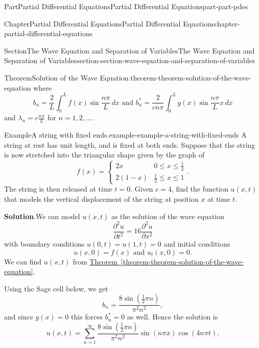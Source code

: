 \documentclass[twoside,10pt,]{book}
\newcommand{\blocktitlefont}{\relax}
\newcommand{\xreffont}{\relax}
\numberwithin{equation}{part}
\newcommand{\pdv}[3][]{\dfrac{\partial^{#1} #2}{\partial #3^{#1}}}
\newcommand{\amp}{&}
\begin{document}
\begin{partptx}{Part}{Partial Differential Equations}{}{Partial Differential Equations}{}{}{part-part-pdes}
\begin{chapterptx}{Chapter}{Partial Differential Equations}{}{Partial Differential Equations}{}{}{chapter-partial-differential-equations}
\begin{sectionptx}{Section}{The Wave Equation and Separation of Variables}{}{The Wave Equation and Separation of Variables}{}{}{section-section-wave-equation-and-separation-of-variables}
\begin{theorem}{Theorem}{Solution of the Wave Equation.}{}{theorem-theorem-solution-of-the-wave-equation}
where%
\begin{equation*}
b_{n} = \frac{2}{L}\int_{0}^{L}f(x)\sin\frac{n\pi}{L}\,dx\text{ and }b^{*}_{n} = \frac{2}{cn\pi}\int_{0}^{L}g(x)\sin\frac{n\pi}{L}x\,dx
\end{equation*}
and \(\lambda_{n} = c\frac{n\pi}{L}\) for \(n=1,2,\ldots\).%
\end{theorem}
\begin{example}{Example}{A string with fixed ends.}{example-example-a-string-with-fixed-ends}%
A string at rest has unit length, and is fixed at both ends. Suppose that the string is now stretched into the triangular shape given by the graph of%
\begin{equation*}
f(x) = \begin{cases} 2x \amp 0\leq x\leq \frac{1}{2} \\ 2(1-x) \amp \frac{1}{2}\leq x\leq 1 \end{cases}.
\end{equation*}
The string is then released at time \(t=0\). Given \(c=4\), find the function \(u(x,t)\) that models the vertical displacement of the string at position \(x\) at time \(t\).%
\par\smallskip%
\noindent\textbf{\blocktitlefont Solution}.\hypertarget{solution-example-a-string-with-fixed-ends-c}{}\quad{}We can model \(u(x,t)\) as the solution of the wave equation%
\begin{equation*}
\pdv[2]{u}{t} = 16\pdv[2]{u}{x}
\end{equation*}
with boundary conditions \(u(0,t) = u(1,t) = 0\) and initial conditions%
\begin{equation*}
u(x,0) = f(x)\text{ and }u_{t}(x,0) = 0.
\end{equation*}
We can find \(u(x,t)\) from \hyperref[theorem-theorem-solution-of-the-wave-equation]{Theorem~{\xreffont\ref{theorem-theorem-solution-of-the-wave-equation}}}.%
\par
Using the Sage cell below, we get%
\begin{equation*}
b_{n} = \frac{8\sin\left(\frac{1}{2} \pi n\right)}{\pi^{2} n^{2}},
\end{equation*}
and since \(g(x) = 0\) this forces \(b^{*}_{n} = 0\) as well. Hence the solution is%
\begin{equation*}
u(x,t) = \sum_{n=1}^{\infty}\frac{8\sin\left(\frac{1}{2} \pi n\right)}{\pi^{2} n^{2}}\sin(n\pi x)\cos(4n\pi t).
\end{equation*}
%
\end{example}
\begin{sageinput}

\end{sageinput}
\end{sectionptx}
\end{chapterptx}
\end{partptx}
\end{document}
